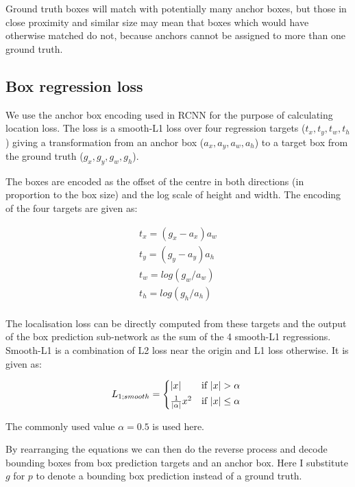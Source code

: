 Ground truth boxes will match with potentially many anchor boxes, but those in close proximity and similar size may mean that boxes which would have otherwise matched do not, because anchors cannot be assigned to more than one ground truth.

\subsection {Box regression loss}


We use the anchor box encoding used in \gls{RCNN} \cite{Wang2017} for the purpose of calculating location loss. The loss is a smooth-L1 loss over four regression targets ($t_x, t_y, t_w, t_h$) giving a transformation from an anchor box ($a_x, a_y, a_w, a_h$)  to a target box from the ground truth ($g_x, g_y, g_w, g_h$). 

The boxes are encoded as the offset of the centre in both directions (in proportion to the box size) and the log scale of height and width. The encoding of the four targets are given as:

\begin{equation}
\begin{split}
t_x = (g_x - a_x) a_w\\
t_y = (g_y - a_y) a_h\\
t_w = log(g_w / a_w)\\
t_h = log(g_h / a_h)\\
\end{split}
\label{eq:encoding_rcnn}
\end{equation}

The localisation loss can be directly computed from these targets and the output of the box prediction sub-network as the sum of the 4 smooth-L1 regressions. Smooth-L1 is a combination of L2 loss near the origin and L1 loss otherwise. It is given as:

\begin{equation}
L_{1;smooth} = 
\begin{cases*}
|x| & if $|x|>\alpha $ \\
\frac{1}{|\alpha|}x^2 & if $|x| \leq \alpha$
\end{cases*}
\label{eq:smooth_l1}
\end{equation}

The commonly used value $\alpha = 0.5$ is used here.

By rearranging the equations we can then do the reverse process and decode bounding boxes from box prediction targets and an anchor box. Here I substitute $ g $ for $ p $ to denote a bounding box prediction instead of a ground truth.

